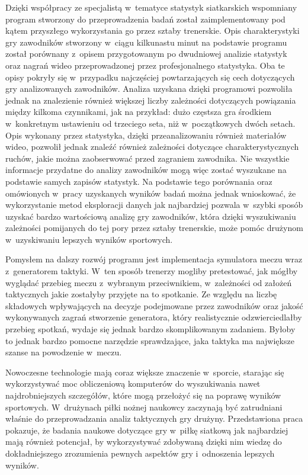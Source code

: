 \documentclass[a4paper,twoside,12pt]{book}
\begin{document}
Dzięki współpracy ze specjalistą w~tematyce statystyk siatkarskich wspomniany program stworzony do przeprowadzenia badań został zaimplementowany pod kątem przyszłego wykorzystania go przez sztaby trenerskie. Opis charakterystyki gry zawodników stworzony w~ciągu kilkunastu minut na podstawie programu został porównany z~opisem przygotowanym po dwudniowej analizie statystyk oraz nagrań wideo przeprowadzonej przez profesjonalnego statystyka. Oba te opisy pokryły się w~przypadku najczęściej powtarzających się cech dotyczących gry analizowanych zawodników. Analiza uzyskana dzięki programowi pozwoliła jednak na znalezienie również większej liczby zależności dotyczących powiązania między kilkoma czynnikami, jak na przykład: dużo częstsza gra środkiem w~konkretnym ustawieniu od trzeciego seta, niż w~początkowych dwóch setach. Opis wykonany przez statystyka, dzięki przeanalizowaniu również materiałów wideo, pozwolił jednak znaleźć również zależności dotyczące charakterystycznych ruchów, jakie można zaobserwować przed zagraniem zawodnika. Nie wszystkie informacje przydatne do analizy zawodników mogą więc zostać wyszukane na podstawie samych zapisów statystyk. Na podstawie tego porównania oraz omówionych w~pracy uzyskanych wyników badań można jednak wnioskować, że wykorzystanie metod eksploracji danych jak najbardziej pozwala w~szybki sposób uzyskać bardzo wartościową analizę gry zawodników, która dzięki wyszukiwaniu zależności pomijanych do tej pory przez sztaby trenerskie, może pomóc drużynom w~uzyskiwaniu lepszych wyników sportowych.

Pomysłem na dalszy rozwój programu jest implementacja symulatora meczu wraz z~generatorem taktyki. W~ten sposób trenerzy mogliby pretestować, jak mógłby wyglądać przebieg meczu z~wybranym przeciwnikiem, w~zależności od założeń taktycznych jakie zostałyby przyjęte na to spotkanie. Ze względu na liczbę składowych wpływających na decyzje podejmowane przez zawodników oraz jakość wykonywanych zagrań stworzenie generatora, który realistycznie odzwierciedlałby przebieg spotkań, wydaje się jednak bardzo skomplikowanym zadaniem. Byłoby to jednak bardzo pomocne narzędzie sprawdzające, jaka taktyka ma największe szanse na powodzenie w~meczu.

Nowoczesne technologie mają coraz większe znaczenie w~sporcie, starając się wykorzystywać moc obliczeniową komputerów do wyszukiwania nawet najdrobniejszych szczegółów, które mogą przełożyć się na poprawę wyników sportowych. W~drużynach piłki nożnej naukowcy zaczynają być zatrudniani właśnie do przeprowadzania analiz taktycznych gry drużyny. Przedstawiona praca pokazuje, że badania naukowe dotyczące gry w~piłkę siatkową jak najbardziej mają również potencjał, by wykorzystywać zdobywaną dzięki nim wiedzę do dokładniejszego zrozumienia pewnych aspektów gry i~odnoszenia lepszych wyników.
\end{document}
